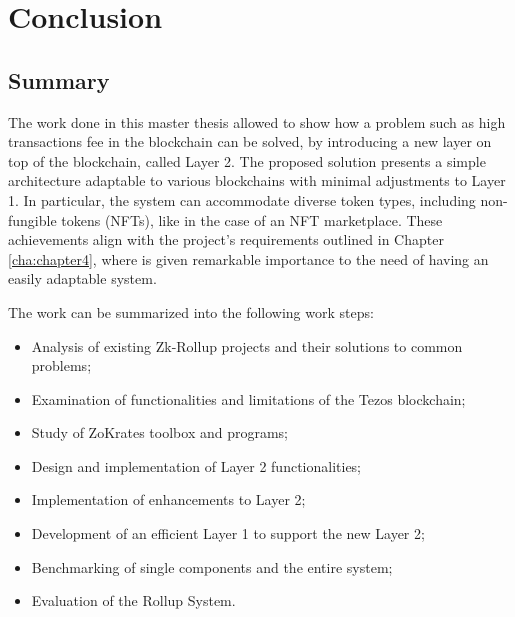 \chapter{Conclusion\label{cha:chapter8}}

\section{Summary\label{sec:summary}}

The work done in this master thesis allowed to show how a problem such as high transactions fee in the blockchain can be solved, by introducing a new layer on top of the blockchain, called Layer 2. The proposed solution presents a simple architecture adaptable to various blockchains with minimal adjustments to Layer 1. In particular, the system can accommodate diverse token types, including non-fungible tokens (NFTs), like in the case of an NFT marketplace. These achievements align with the project's requirements outlined in Chapter \ref{cha:chapter4}, where is given remarkable importance to the need of having an easily adaptable system.

\noindent The work can be summarized into the following work steps:
\vspace{-0.11in}
\begin{itemize}
	\item Analysis of existing Zk-Rollup projects and their solutions to common problems;
	      \vspace{-0.11in}
	\item Examination of functionalities and limitations of the Tezos blockchain;
	      \vspace{-0.11in}
	\item Study of ZoKrates toolbox and programs;
	      \vspace{-0.11in}
	\item Design and implementation of Layer 2 functionalities;
	      \vspace{-0.11in}
	\item Implementation of enhancements to Layer 2;
	      \vspace{-0.11in}
	\item Development of an efficient Layer 1 to support the new Layer 2;
	      \vspace{-0.11in}
	\item Benchmarking of single components and the entire system;
	      \vspace{-0.11in}
	\item Evaluation of the Rollup System.
\end{itemize}

